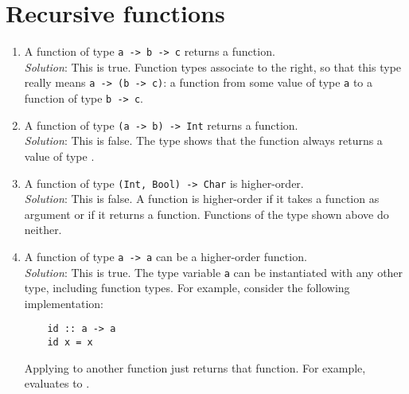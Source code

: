 \section{Recursive functions}

\taskLine

	
\begin{enumerate}
	\item A function of type \texttt{\small a -> b -> c} returns a function. \\
	\emph{Solution}: This is true. Function types associate to the right, so that this type really means \texttt{\small a -> (b -> c)}: a function from some value of type \texttt{\small a} to a function of type \texttt{\small b -> c}.
	\item A function of type \texttt{\small (a -> b) -> Int} returns a function. \\
	\emph{Solution}: This is false. The type shows that the function always returns a value of type .
	\item A function of type \texttt{\small (Int, Bool) -> Char} is higher-order. \\
	\emph{Solution}: This is false. A function is higher-order if it takes a function as argument or if it returns a function. Functions of the type shown above do neither.
	\item A function of type \texttt{\small a -> a} can be a higher-order function.\\
	\emph{Solution}: This is true. The type variable \texttt{\small a} can be instantiated with any other type, including function types. For example, consider the following implementation:
	\begin{verbatim}
	id :: a -> a
	id x = x
	\end{verbatim}
	Applying  to another function just returns that function. For example,  evaluates to .
\end{enumerate}

\taskLine

	
